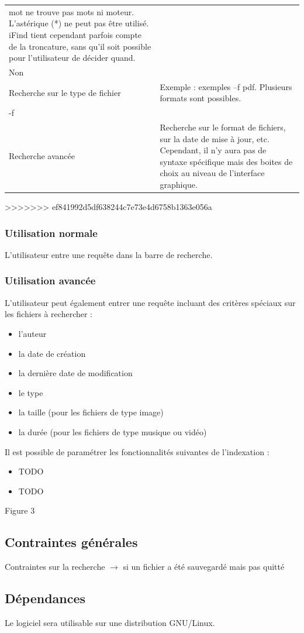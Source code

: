 \documentclass[a4paper,10pt]{report}
\begin{document}
\begin{tabular}{|p{4cm}|p{10cm}|}
mot ne trouve pas
mots ni moteur. L'astérique (*) ne peut pas être utilisé. iFind tient cependant
parfois compte de la troncature, sans qu'il soit possible pour l'utilisateur de
décider quand.\\
Non & \\
\hline
 Recherche sur le type   de fichier & Exemple : exemples –f pdf. Plusieurs
formats sont possibles.\\
 -f & \\
\hline
Recherche avancée & Recherche sur le format de fichiers, sur la date de mise à
jour, etc. Cependant,
il n’y aura pas de syntaxe spécifique mais des boites de choix au niveau de
l’interface graphique.\\
\hline
\end{tabular}
 
>>>>>>> ef841992d5df638244c7e73e4d6758b1363e056a
\subsubsection{Utilisation normale}
L'utilisateur entre une requête dans la barre de recherche.

\subsubsection{Utilisation avancée}
L'utilisateur peut également entrer une requête incluant des critères spéciaux
sur les fichiers à rechercher :
\begin{itemize}
 \item l'auteur
 \item la date de création
 \item la dernière date de modification
 \item le type
 \item la taille (pour les fichiers de type image)
 \item la durée (pour les fichiers de type musique ou vidéo)
\end{itemize}
Il est possible de paramétrer les fonctionnalités suivantes de l'indexation :
\begin{itemize}
 \item TODO
 \item TODO
\end{itemize}

Figure 3

\subsection{Contraintes générales}
Contraintes sur la recherche $\rightarrow$ si un fichier a été sauvegardé mais
pas quitté

\subsection{Dépendances}
Le logiciel sera utilisable sur une distribution GNU/Linux.
\end{document}
